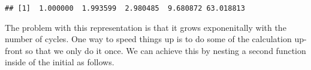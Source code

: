 \documentclass[]{book}
\newenvironment{Shaded}{\begin{snugshade}}{\end{snugshade}}
\newcommand{\ControlFlowTok}[1]{\textcolor[rgb]{0.13,0.29,0.53}{\textbf{#1}}}
\newcommand{\DataTypeTok}[1]{\textcolor[rgb]{0.13,0.29,0.53}{#1}}
\newcommand{\DecValTok}[1]{\textcolor[rgb]{0.00,0.00,0.81}{#1}}
\newcommand{\KeywordTok}[1]{\textcolor[rgb]{0.13,0.29,0.53}{\textbf{#1}}}
\newcommand{\NormalTok}[1]{#1}
\newcommand{\OperatorTok}[1]{\textcolor[rgb]{0.81,0.36,0.00}{\textbf{#1}}}
\begin{document}
\begin{Shaded}
\end{Shaded}

\begin{verbatim}
## [1]  1.000000  1.993599  2.980485  9.680872 63.018813
\end{verbatim}

The problem with this representation is that it grows exponenitally with the number of cycles.
One way to speed things up is to do some of the calculation up-front so that we only do it once.
We can achieve this by nesting a second function inside of the initial as follows.
\end{document}
